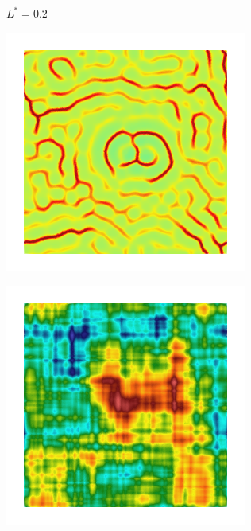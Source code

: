 \begin{figure}[!htbp]
\begin{subfigure}[b]{0.15\textwidth}
    \caption{$L^* = 0.2$}
    \label{fig: Chapter4/2D/psic_sqexp_cartesian_20_20_rho_0_seed_a}
  \end{subfigure}
  \begin{subfigure}[b]{0.15\textwidth}
    \includegraphics[width=\textwidth]{Chapter4/figures/2D/d_sqexp_cartesian_20_20_rho_0_seed_a.png}
    \caption{}
    \label{fig: Chapter4/2D/d_sqexp_cartesian_20_20_rho_0_seed_a}
  \end{subfigure}
  \begin{subfigure}[b]{0.15\textwidth}
    \includegraphics[width=\textwidth]{Chapter4/figures/2D/Gc_exp_cartesian_20_20_rho_0_seed_b.png}

\end{subfigure}
\end{figure}
